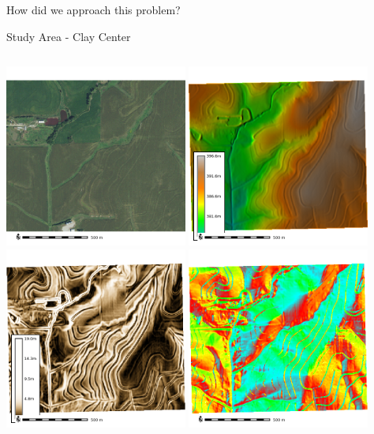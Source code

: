 \documentclass[
  ignorenonframetext,
]{beamer}
\begin{document}
\begin{frame}[fragile]{How did we approach this problem?}
\begin{block}{Study Area - Clay Center}
\label{study-area---clay-center}
\begin{columns}[T]
\begin{column}{0.5\textwidth}
\includegraphics[width=0.45\textwidth,height=\textheight]{../output/clay-center/naip.png}
\includegraphics[width=0.45\textwidth,height=\textheight]{../output/clay-center/elev.png}
\includegraphics[width=0.45\textwidth,height=\textheight]{../output/clay-center/slope.png}
\includegraphics[width=0.45\textwidth,height=\textheight]{../output/clay-center/aspect.png}
\end{column}


\end{columns}
\end{block}
\end{frame}
\end{document}
